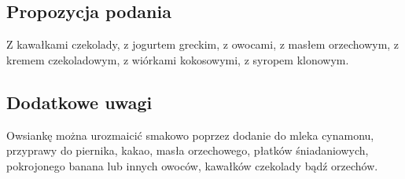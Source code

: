\subsection*{Propozycja podania}
Z kawałkami czekolady, z jogurtem greckim, z owocami, z masłem orzechowym, z kremem czekoladowym, z wiórkami kokosowymi, z syropem klonowym.
\vspace{0.3cm}

\subsection*{Dodatkowe uwagi}
Owsiankę można urozmaicić smakowo poprzez dodanie do mleka cynamonu, przyprawy do piernika, kakao, masła orzechowego, płatków śniadaniowych, pokrojonego banana lub innych owoców, kawałków czekolady bądź orzechów.
\newpage